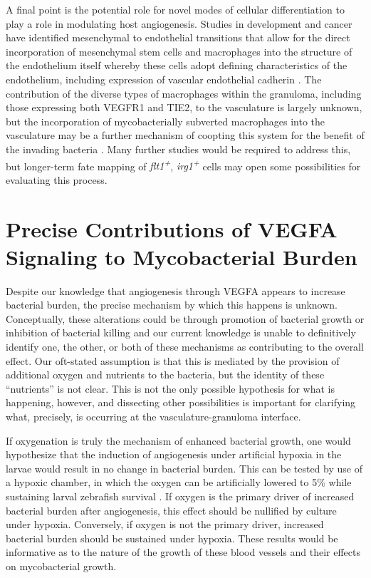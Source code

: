 A final point is the potential role for novel modes of cellular differentiation to play a role in modulating host angiogenesis. Studies in development and cancer have identified mesenchymal to endothelial transitions that allow for the direct incorporation of mesenchymal stem cells and macrophages into the structure of the endothelium itself whereby these cells adopt defining characteristics of the endothelium, including expression of vascular endothelial cadherin \citep{Wu2007, Zhang2008b, Ubil2014}. The contribution of the diverse types of macrophages within the granuloma, including those expressing both VEGFR1 and TIE2, to the vasculature is largely unknown, but the incorporation of mycobacterially subverted macrophages into the vasculature may be a further mechanism of coopting this system for the benefit of the invading bacteria \citep{Hall2012, deCortie2014}. Many further studies would be required to address this, but longer\hyp{}term fate mapping of \textit{flt1\textsuperscript{+}}, \textit{irg1\textsuperscript{+}} cells may open some possibilities for evaluating this process.

\section{Precise Contributions of VEGFA Signaling to Mycobacterial Burden}

Despite our knowledge that angiogenesis through VEGFA appears to increase bacterial burden, the precise mechanism by which this happens is unknown. Conceptually, these alterations could be through promotion of bacterial growth or inhibition of bacterial killing and our current knowledge is unable to definitively identify one, the other, or both of these mechanisms as contributing to the overall effect. Our oft\hyp{}stated assumption is that this is mediated by the provision of additional oxygen and nutrients to the bacteria, but the identity of these ``nutrients'' is not clear. This is not the only possible hypothesis for what is happening, however, and dissecting other possibilities is important for clarifying what, precisely, is occurring at the vasculature\hyp{}granuloma interface. 

If oxygenation is truly the mechanism of enhanced bacterial growth, one would hypothesize that the induction of angiogenesis under artificial hypoxia in the larvae would result in no change in bacterial burden. This can be tested by use of a hypoxic chamber, in which the oxygen can be artificially lowered to 5\% while sustaining larval zebrafish survival \citep{Rombough2009, Long2015}. If oxygen is the primary driver of increased bacterial burden after angiogenesis, this effect should be nullified by culture under hypoxia. Conversely, if oxygen is not the primary driver, increased bacterial burden should be sustained under hypoxia. These results would be informative as to the nature of the growth of these blood vessels and their effects on mycobacterial growth.

